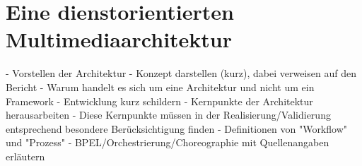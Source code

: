 \chapter{Eine dienstorientierten Multimediaarchitektur} %
\label{cha:eine_dienstorientierten_multimediaarchitektur}

- Vorstellen der Architektur
- Konzept darstellen (kurz), dabei verweisen auf den Bericht
- Warum handelt es sich um eine Architektur und nicht um ein Framework
- Entwicklung kurz schildern
- Kernpunkte der Architektur herausarbeiten
- Diese Kernpunkte müssen in der Realisierung/Validierung entsprechend besondere Berücksichtigung finden
- Definitionen von "Workflow" und "Prozess"
- BPEL/Orchestrierung/Choreographie mit Quellenangaben erläutern

